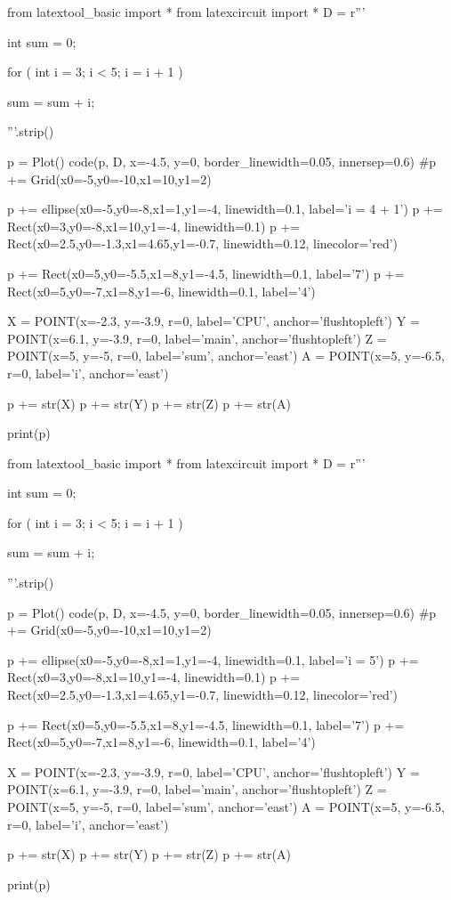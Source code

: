 \begin{python}
from latextool_basic import *
from latexcircuit import *
D = r'''



int sum = 0;

    for ( int i = 3;     i < 5;     i = i + 1 )


        sum = sum + i;



'''.strip()

p = Plot()
code(p, D, x=-4.5, y=0, border_linewidth=0.05, innersep=0.6)
#p += Grid(x0=-5,y0=-10,x1=10,y1=2)

p += ellipse(x0=-5,y0=-8,x1=1,y1=-4, linewidth=0.1, label='i = 4 + 1')
p += Rect(x0=3,y0=-8,x1=10,y1=-4, linewidth=0.1)
p += Rect(x0=2.5,y0=-1.3,x1=4.65,y1=-0.7, linewidth=0.12, linecolor='red')

p += Rect(x0=5,y0=-5.5,x1=8,y1=-4.5, linewidth=0.1, label='7')
p += Rect(x0=5,y0=-7,x1=8,y1=-6, linewidth=0.1, label='4')

X = POINT(x=-2.3, y=-3.9, r=0, label='CPU', anchor='flushtopleft')
Y = POINT(x=6.1, y=-3.9, r=0, label='main', anchor='flushtopleft')
Z = POINT(x=5, y=-5, r=0, label='sum', anchor='east')
A = POINT(x=5, y=-6.5, r=0, label='i', anchor='east')

p += str(X)
p += str(Y)
p += str(Z)
p += str(A)

print(p)
\end{python}

\begin{python}
from latextool_basic import *
from latexcircuit import *
D = r'''



int sum = 0;

    for ( int i = 3;     i < 5;     i = i + 1 )


        sum = sum + i;



'''.strip()

p = Plot()
code(p, D, x=-4.5, y=0, border_linewidth=0.05, innersep=0.6)
#p += Grid(x0=-5,y0=-10,x1=10,y1=2)

p += ellipse(x0=-5,y0=-8,x1=1,y1=-4, linewidth=0.1, label='i = 5')
p += Rect(x0=3,y0=-8,x1=10,y1=-4, linewidth=0.1)
p += Rect(x0=2.5,y0=-1.3,x1=4.65,y1=-0.7, linewidth=0.12, linecolor='red')

p += Rect(x0=5,y0=-5.5,x1=8,y1=-4.5, linewidth=0.1, label='7')
p += Rect(x0=5,y0=-7,x1=8,y1=-6, linewidth=0.1, label='4')

X = POINT(x=-2.3, y=-3.9, r=0, label='CPU', anchor='flushtopleft')
Y = POINT(x=6.1, y=-3.9, r=0, label='main', anchor='flushtopleft')
Z = POINT(x=5, y=-5, r=0, label='sum', anchor='east')
A = POINT(x=5, y=-6.5, r=0, label='i', anchor='east')

p += str(X)
p += str(Y)
p += str(Z)
p += str(A)

print(p)
\end{python}

